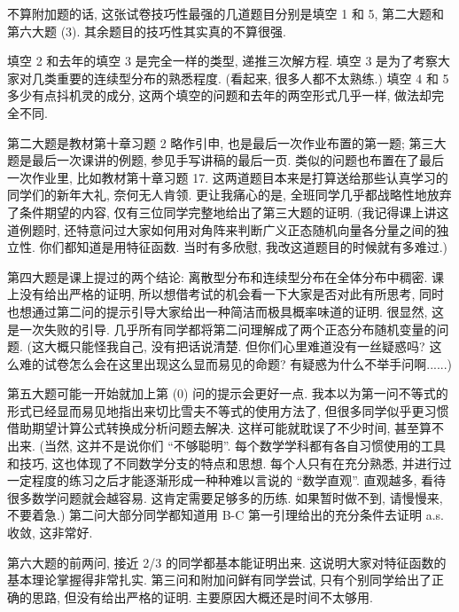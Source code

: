 \begin{proofc}[李利平老师对试卷的总结]
    不算附加题的话, 这张试卷技巧性最强的几道题目分别是填空 1 和 5, 
    第二大题和第六大题 (3). 其余题目的技巧性其实真的不算很强.
    
    填空 2 和去年的填空 3 是完全一样的类型, 递推三次解方程. 
    填空 3 是为了考察大家对几类重要的连续型分布的熟悉程度. 
    (看起来, 很多人都不太熟练.) 填空 4 和 5 多少有点抖机灵的成分, 
    这两个填空的问题和去年的两空形式几乎一样, 做法却完全不同.
    
    第二大题是教材第十章习题 2 略作引申, 也是最后一次作业布置的第一题; 
    第三大题是最后一次课讲的例题, 参见手写讲稿的最后一页. 
    类似的问题也布置在了最后一次作业里, 比如教材第十章习题 17. 
    这两道题目本来是打算送给那些认真学习的同学们的新年大礼, 奈何无人肯领. 
    更让我痛心的是, 全班同学几乎都战略性地放弃了条件期望的内容, 
    仅有三位同学完整地给出了第三大题的证明. (我记得课上讲这道例题时, 
    还特意问过大家如何用对角阵来判断广义正态随机向量各分量之间的独立性. 
    你们都知道是用特征函数. 当时有多欣慰, 我改这道题目的时候就有多难过.)
    
    第四大题是课上提过的两个结论: 离散型分布和连续型分布在全体分布中稠密. 
    课上没有给出严格的证明, 所以想借考试的机会看一下大家是否对此有所思考, 
    同时也想通过第二问的提示引导大家给出一种简洁而极具概率味道的证明. 
    很显然, 这是一次失败的引导. 几乎所有同学都将第二问理解成了两个正态分布随机变量的问题. 
    (这大概只能怪我自己, 没有把话说清楚. 但你们心里难道没有一丝疑惑吗? 
    这么难的试卷怎么会在这里出现这么显而易见的命题? 有疑惑为什么不举手问啊......)
    
    第五大题可能一开始就加上第 (0) 问的提示会更好一点. 
    我本以为第一问不等式的形式已经显而易见地指出来切比雪夫不等式的使用方法了, 
    但很多同学似乎更习惯借助期望计算公式转换成分析问题去解决. 
    这样可能就耽误了不少时间, 甚至算不出来. 
    (当然, 这并不是说你们 “不够聪明”. 每个数学学科都有各自习惯使用的工具和技巧, 
    这也体现了不同数学分支的特点和思想. 每个人只有在充分熟悉, 
    并进行过一定程度的练习之后才能逐渐形成一种种难以言说的 “数学直观”. 
    直观越多, 看待很多数学问题就会越容易. 
    这肯定需要足够多的历练. 如果暂时做不到, 请慢慢来, 不要着急.) 
    第二问大部分同学都知道用 B-C 第一引理给出的充分条件去证明 a.s. 收敛, 这非常好.
    
    第六大题的前两问, 接近 2/3 的同学都基本能证明出来. 
    这说明大家对特征函数的基本理论掌握得非常扎实. 
    第三问和附加问鲜有同学尝试, 只有个别同学给出了正确的思路, 
    但没有给出严格的证明. 主要原因大概还是时间不太够用.
\end{proofc}


